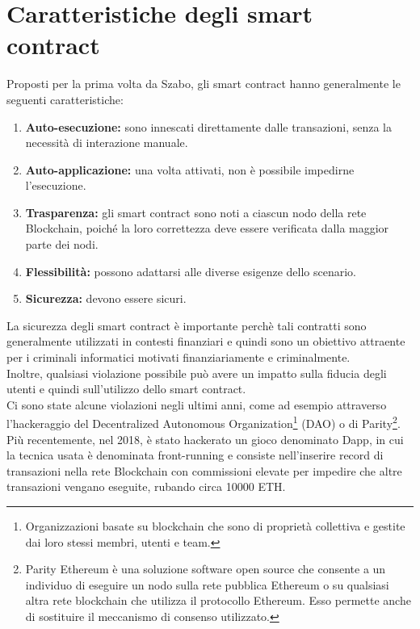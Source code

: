 \documentclass[a4paper,11pt]{report}
\begin{document}
\section{Caratteristiche degli smart contract}
Proposti per la prima volta da Szabo, gli smart contract hanno generalmente le seguenti caratteristiche:
\begin{enumerate}
\item \textbf{Auto-esecuzione:} sono innescati direttamente dalle transazioni, senza la necessità di interazione manuale.
\item \textbf{Auto-applicazione:} una volta attivati, non è possibile impedirne l'esecuzione.
\item \textbf{Trasparenza:} gli smart contract sono noti a ciascun nodo della rete Blockchain, poiché la loro correttezza deve essere verificata dalla maggior parte dei nodi.
\item \textbf{Flessibilità:} possono adattarsi alle diverse esigenze dello scenario.
\item \textbf{Sicurezza:} devono essere sicuri.
\end{enumerate}
La sicurezza degli smart contract è importante perchè tali contratti sono generalmente utilizzati in contesti finanziari e quindi sono un obiettivo attraente per i criminali informatici motivati finanziariamente e criminalmente.\\
Inoltre, qualsiasi violazione possibile può avere un impatto sulla fiducia degli utenti e quindi sull'utilizzo dello smart contract.\\
Ci sono state alcune violazioni negli ultimi anni, come ad esempio attraverso l'hackeraggio del Decentralized Autonomous Organization\footnote{Organizzazioni basate su blockchain che sono di proprietà collettiva e gestite dai loro stessi membri, utenti e team.} (DAO) o di Parity\footnote{Parity Ethereum è una soluzione software open source che consente a un individuo di eseguire un nodo sulla rete pubblica Ethereum o su qualsiasi altra rete blockchain che utilizza il protocollo Ethereum. Esso permette anche di sostituire il meccanismo di consenso utilizzato.}. Più recentemente, nel 2018, è stato hackerato un gioco denominato Dapp, in cui la tecnica usata è denominata front-running e consiste nell'inserire record di transazioni nella rete Blockchain con commissioni elevate per impedire che altre transazioni vengano eseguite, rubando circa 10000 ETH.
\end{document}
